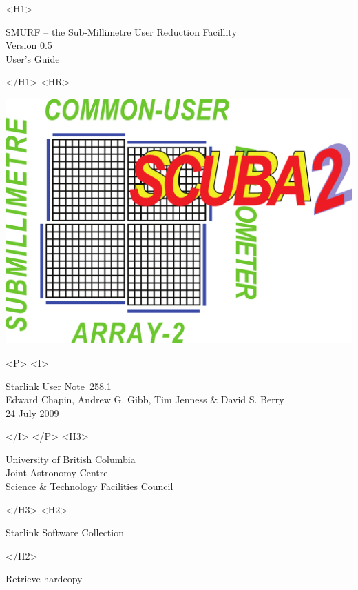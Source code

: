 \documentclass[twoside,11pt]{article}
\newcommand{\stardoccategory}  {Starlink User Note}
\newcommand{\stardocsource}    {sun\stardocnumber}
\newcommand{\stardocnumber}    {258.1}
\newcommand{\stardocauthors}   {Edward Chapin, Andrew G. Gibb, Tim Jenness \& David S. Berry}
\newcommand{\stardocdate}      {24 July 2009}
\newcommand{\stardoctitle}     {SMURF -- the Sub-Millimetre User Reduction Facillity}
\newcommand{\stardocversion}   {Version 0.5}
\newcommand{\stardocmanual}    {User's Guide}
\newcommand{\htmladdnormallink}[2]{#1}
\newcommand{\htmladdimg}[1]{}
\newcommand{\xlabel}[1]{}
\renewcommand{\_}{\texttt{\symbol{95}}}
\begin{document}
\begin{htmlonly}
   \xlabel{}
   \begin{rawhtml} <H1> \end{rawhtml}
      \stardoctitle\\
      \stardocversion\\
      \stardocmanual
   \begin{rawhtml} </H1> <HR> \end{rawhtml}

\includegraphics[scale=0.7]{sun258_logo}

   \begin{rawhtml} <P> <I> \end{rawhtml}
   \stardoccategory\ \stardocnumber \\
   \stardocauthors \\
   \stardocdate
   \begin{rawhtml} </I> </P> <H3> \end{rawhtml}
      \htmladdnormallink{University of British Columbia}
                        {http://www.ubc.ca} \\
      \htmladdnormallink{Joint Astronomy Centre}
                        {http://www.jach.hawaii.edu}\\
      \htmladdnormallink{Science \& Technology Facilities Council}
                        {http://www.pparc.ac.uk} \\
   \begin{rawhtml} </H3> <H2> \end{rawhtml}
      \htmladdnormallink{Starlink Software Collection}{http://starlink.jach.hawaii.edu/}
   \begin{rawhtml} </H2> \end{rawhtml}
   \htmladdnormallink{\htmladdimg{source.gif} Retrieve hardcopy}
      {http://starlink.jach.hawaii.edu/cgi-bin/hcserver?\stardocsource}\\


\end{htmlonly}
\end{document}
